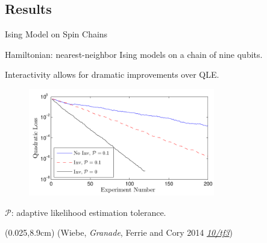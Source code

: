\documentclass[xcolor=dvipsnames, compress]{beamer}
\renewcommand\UrlFont{\color{red}\rmfamily\itshape}
\newcommand{\shortdoi}[1]{\href{http://doi.org/#1}{\UrlFont 10/#1}}
\newcommand{\bottomnote}[1]{
  \begin{textblock*}{0.95\paperwidth} (0.025\paperwidth,8.9cm)
    {\tiny \hfill #1}
  \end{textblock*}
}
\begin{document}

\subsection{Results}

\begin{frame}{Ising Model on Spin Chains}

    Hamiltonian: nearest-neighbor Ising models on a chain
    of nine qubits.

    Interactivity allows for dramatic improvements over
    QLE.
    
    \begin{figure}
      \includegraphics[width=0.725\textwidth]{figures/poison}
    \end{figure}

    $\mathcal{P}$: adaptive likelihood estimation tolerance.

  \bottomnote{(Wiebe, \emph{Granade}, Ferrie and Cory 2014 \shortdoi{tf3})}

\end{frame}
\end{document}
